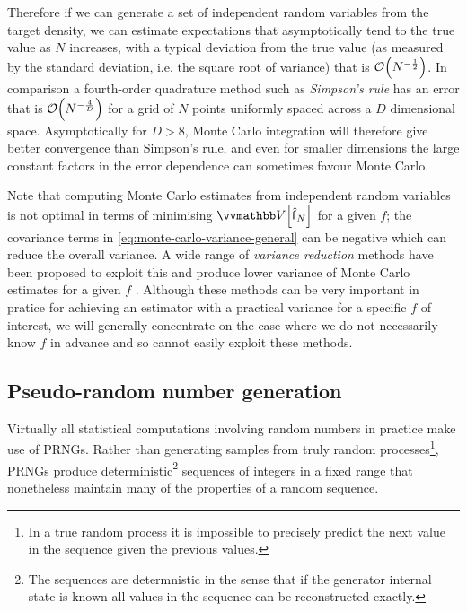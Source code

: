 Therefore if we can generate a set of independent random variables from the target density, we can estimate expectations that asymptotically tend to the true value as $N$ increases, with a typical deviation from the true value (as measured by the standard deviation, i.e. the square root of variance) that is $\mathcal{O}\lpa N^{-\frac{1}{2}}\rpa$. In comparison a fourth-order quadrature method such as \emph{Simpson's rule} has an error that is $\mathcal{O}\lpa N^{-\frac{4}{D}}\rpa$ for a grid of $N$ points uniformly spaced across a $D$ dimensional space. Asymptotically for $D > 8$, Monte Carlo integration will therefore give better convergence than Simpson's rule, and even for smaller dimensions the large constant factors in the error dependence can sometimes favour Monte Carlo.

Note that computing Monte Carlo estimates from independent random variables is not optimal in terms of minimising $\var{\hatf_N}$ for a given $f$; the covariance terms in \eqref{eq:monte-carlo-variance-general} can be negative which can reduce the overall variance. A wide range of \emph{variance reduction} methods have been proposed to exploit this and produce lower variance of Monte Carlo estimates for a given $f$ \citep{kroese2011variance}. Although these methods can be very important in pratice for achieving an estimator with a practical variance for a specific $f$ of interest, we will generally concentrate on the case where we do not necessarily know $f$ in advance and so cannot easily exploit these methods. %

\subsection{Pseudo-random number generation}

Virtually all statistical computations involving random numbers in practice make use of \acp{PRNG}. Rather than generating samples from truly random processes\footnote{In a true random process it is impossible to precisely predict the next value in the sequence given the previous values.}, \acp{PRNG} produce deterministic\footnote{The sequences are determnistic in the sense that if the generator internal state is known all values in the sequence can be reconstructed exactly.} sequences of integers in a fixed range that nonetheless maintain many of the properties of a random sequence. 

